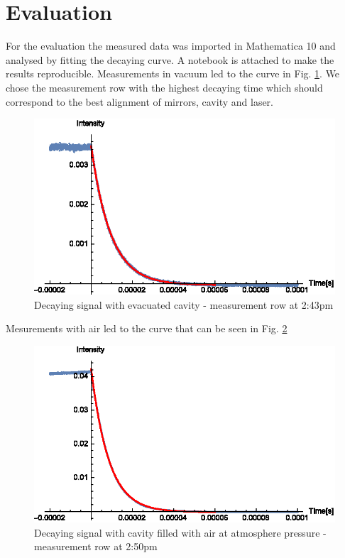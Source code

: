\documentclass[
	parskip=half,10pt,
	numbers= noenddot, %
	toc=flat, %
	oneside,
	twocolumn,
	]{scrartcl}
\begin{document}
\section{Evaluation}
For the evaluation the measured data was imported in Mathematica 10 and analysed by fitting the decaying curve. A notebook is attached to make the results reproducible.
Measurements in vacuum led to the curve in Fig. \ref{fig:vacuum}. We chose the measurement row with the highest decaying time which should correspond to the best alignment of mirrors, cavity and laser. 
\begin{figure}
\includegraphics[width=\textwidth/2]{images/vacuum.eps}
\caption{Decaying signal with evacuated cavity - measurement row at 2:43pm}
\label{fig:vacuum}
\end{figure}
Mesurements with air led to the curve that can be seen in Fig. \ref{fig:air}
\begin{figure}
\includegraphics[width=\textwidth/2]{images/air.eps}
\caption{Decaying signal with cavity filled with air at atmosphere pressure - measurement row at 2:50pm}
\label{fig:air}
\end{figure}
\end{document}

